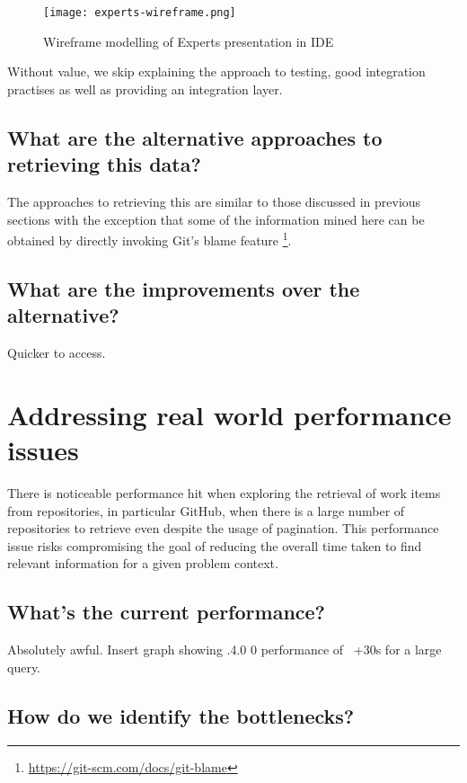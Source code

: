 \begin{figure}[h!]
	\centering
	\texttt{[image: experts-wireframe.png]}
	\caption{Wireframe modelling of Experts presentation in IDE}
	\label{fig:expertsWireframe}
\end{figure}

Without value, we skip explaining the approach to testing, good integration practises as well as providing an integration layer.

\subsection{What are the alternative approaches to retrieving this data?}

The approaches to retrieving this are similar to those discussed in previous sections with the exception that some of the information mined here can be obtained by directly invoking Git's blame feature \footnote{\url{https://git-scm.com/docs/git-blame}}.

\subsection{What are the improvements over the alternative?}

Quicker to access.

\section{Addressing real world performance issues}

There is noticeable performance hit when exploring the retrieval of work items from repositories, in particular GitHub, when there is a large number of repositories to retrieve even despite the usage of pagination. This performance issue risks compromising the goal of reducing the overall time taken to find relevant information for a given problem context.

\subsection{What's the current performance?}

Absolutely awful. Insert graph showing .4.0 0 performance of ~+30s for a large query.

\subsection{How do we identify the bottlenecks?}

